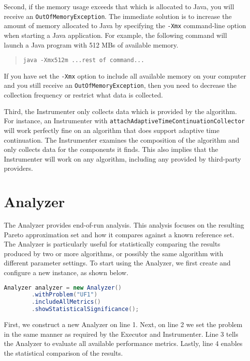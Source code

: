 Second, if the memory usage exceeds that which is allocated to Java, you will receive an \texttt{OutOfMemoryException}.  The immediate solution is to increase the amount of memory allocated to Java by specifying the \texttt{-Xmx} command-line option when starting a Java application.  For example, the following command will launch a Java program with 512 MBs of available memory.

\begin{quote}
  \texttt{java -Xmx512m ...rest of command...}
\end{quote}

If you have set the \texttt{-Xmx} option to include all available memory on your computer and you still receive an \texttt{OutOfMemoryException}, then you need to decrease the collection frequency or restrict what data is collected.

Third, the Instrumenter only collects data which is provided by the algorithm.  For instance, an Instrumenter with \texttt{attachAdaptiveTimeContinuationCollector} will work perfectly fine on an algorithm that does support adaptive time continuation.  The Instrumenter examines the composition of the algorithm and only collects data for the components it finds.  This also implies that the Instrumenter will work on any algorithm, including any provided by third-party providers.

\section{Analyzer}
The Analyzer provides end-of-run analysis.  This analysis focuses on the resulting Pareto approximation set and how it compares against a known reference set.  The Analyzer is particularly useful for statistically comparing the results produced by two or more algorithms, or possibly the same algorithm with different parameter settings.  To start using the Analyzer, we first create and configure a new instance, as shown below.

\begin{lstlisting}[language=Java]
Analyzer analyzer = new Analyzer()
		.withProblem("UF1")
		.includeAllMetrics()
		.showStatisticalSignificance();
\end{lstlisting}

First, we construct a new Analyzer on line 1.  Next, on line 2 we set the problem in the same manner as required by the Executor and Instrumenter.  Line 3 tells the Analyzer to evaluate all available performance metrics.  Lastly, line 4 enables the statistical comparison of the results.

